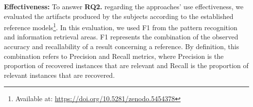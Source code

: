 %     

\textbf{Effectiveness:} 
To answer \textbf{RQ2.} regarding the approaches' use effectiveness, we evaluated the artifacts produced by the subjects according to the established reference models\footnote{Available at: \url{https://doi.org/10.5281/zenodo.5454378}}. 
In this evaluation, we used F1 from the pattern recognition and information retrieval areas. 
F1 represents the combination of the observed accuracy and recallability of a result concerning a reference.
By definition, this combination refers to Precision and Recall metrics, where Precision is the proportion of recovered instances that are relevant and Recall is the proportion of relevant instances that are recovered.


